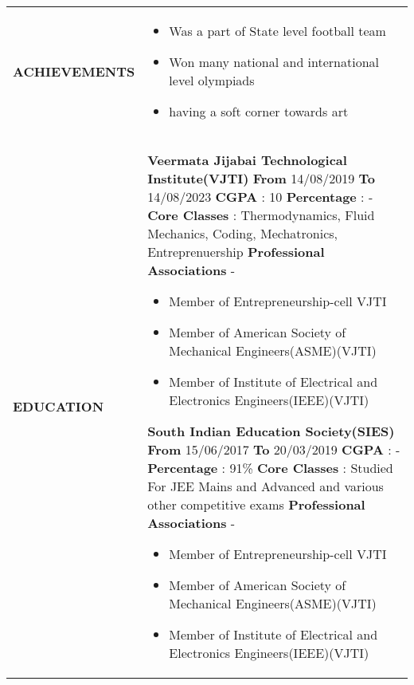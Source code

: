 \documentclass{article}
\begin{document}
{\begin{longtable}{ p{3.5cm}|p{13.5cm} }
\\
{\textbf{\uppercase{Achievements}}}&

\begin{itemize}[noitemsep,nolistsep]
	\item Was a part of State level football team
	\item Won many national and international level olympiads
	\item having a soft corner towards art
\end{itemize}
\\
{\textbf{\uppercase{Education}}}&

\textbf{Veermata Jijabai Technological Institute(VJTI)}  \newline \textbf{From} 14/08/2019 \textbf{To} 14/08/2023 \hspace{1cm} \textbf{CGPA} : 10 \hspace{1cm}  \textbf{Percentage} : - \newline \textbf{Core Classes} :
Thermodynamics, Fluid Mechanics, Coding, Mechatronics, Entreprenuership \newline
\textbf{Professional Associations} - 
\begin{itemize}[noitemsep,nolistsep]
	\item Member of Entrepreneurship-cell VJTI
    \item Member of American Society of Mechanical Engineers(ASME)(VJTI)
    \item Member of Institute of Electrical and Electronics Engineers(IEEE)(VJTI)\newline
\end{itemize} 


\textbf{South Indian Education Society(SIES)} \newline \textbf{From} 15/06/2017 \textbf{To} 20/03/2019 \hspace{1cm}   \textbf{CGPA} : -  \hspace{1cm}      \textbf{Percentage} : 91\% \newline \textbf{Core Classes} :
Studied For JEE Mains and Advanced and various other competitive exams \newline
\textbf{Professional Associations} -
\begin{itemize}[noitemsep,nolistsep]
	\item Member of Entrepreneurship-cell VJTI
    \item Member of American Society of Mechanical Engineers(ASME)(VJTI)
    \item Member of Institute of Electrical and Electronics Engineers(IEEE)(VJTI)\newline
\end{itemize} 


\end{longtable}}
\end{document}
